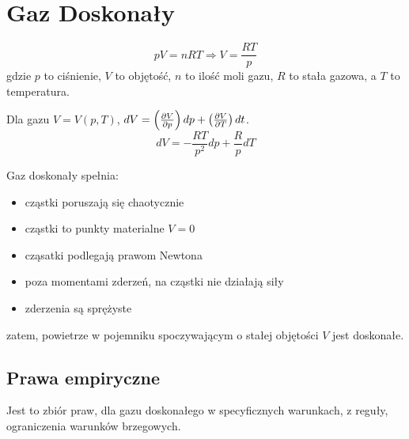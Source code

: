 \documentclass{../notatki}
\begin{document}
\section{Gaz Doskonały}

$$
pV = nRT \Rightarrow V = \frac{RT}{p}
$$
gdzie $p$ to ciśnienie, $V$ to objętość, $n$ to ilość moli gazu, $R$
to stała gazowa, a $T$ to temperatura.

\begin{examplebox}
  Dla gazu $V = V(p, T)$, $dV = \left(\frac{\partial V}{\partial p}\right) dp +
  \left(\frac{\partial V}{\partial T}\right) dt$.
  $$
  dV = -\frac{RT}{p^2}dp + \frac{R}{p}dT
  $$
\end{examplebox}

Gaz doskonały spełnia:
\begin{itemize}
  \item cząstki poruszają się chaotycznie
  \item cząstki to punkty materialne $V = 0$
  \item cząsatki podlegają prawom Newtona
  \item poza momentami zderzeń, na cząstki nie działają siły
  \item zderzenia są sprężyste
\end{itemize}
zatem, powietrze w pojemniku spoczywającym o stałej objętości $V$
jest doskonałe.

\subsection{Prawa empiryczne}

Jest to zbiór praw, dla gazu doskonałego w specyficznych warunkach, z reguły,
ograniczenia warunków brzegowych.
\end{document}
